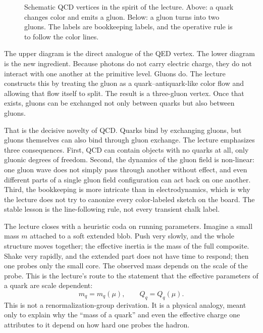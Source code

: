 \begin{figure}[h]
\centering
{}

\bigskip

\caption{Schematic QCD vertices in the spirit of the lecture. Above: a quark changes color and emits a gluon. Below: a gluon turns into two gluons. The labels are bookkeeping labels, and the operative rule is to follow the color lines.}
\end{figure}

The upper diagram is the direct analogue of the QED vertex. The lower diagram is the new ingredient. Because photons do not carry electric charge, they do not interact with one another at the primitive level. Gluons do. The lecture constructs this by treating the gluon as a quark--antiquark-like color flow and allowing that flow itself to split. The result is a three-gluon vertex. Once that exists, gluons can be exchanged not only between quarks but also between gluons.

That is the decisive novelty of QCD. Quarks bind by exchanging gluons, but gluons themselves can also bind through gluon exchange. The lecture emphasizes three consequences. First, QCD can contain objects with no quarks at all, only gluonic degrees of freedom. Second, the dynamics of the gluon field is non-linear: one gluon wave does not simply pass through another without effect, and even different parts of a single gluon field configuration can act back on one another. Third, the bookkeeping is more intricate than in electrodynamics, which is why the lecture does not try to canonize every color-labeled sketch on the board. The stable lesson is the line-following rule, not every transient chalk label.

The lecture closes with a heuristic coda on running parameters. Imagine a small mass \(m\) attached to a soft extended blob. Push very slowly, and the whole structure moves together; the effective inertia is the mass of the full composite. Shake very rapidly, and the extended part does not have time to respond; then one probes only the small core. The observed mass depends on the scale of the probe. This is the lecture's route to the statement that the effective parameters of a quark are scale dependent:
\begin{equation}
m_q=m_q(\mu),
\qquad
Q_q=Q_q(\mu).
\end{equation}
This is not a renormalization-group derivation. It is a physical analogy, meant only to explain why the ``mass of a quark'' and even the effective charge one attributes to it depend on how hard one probes the hadron.

